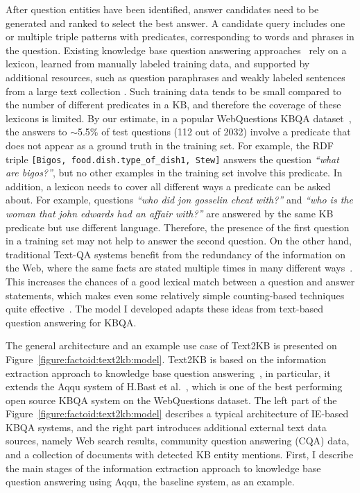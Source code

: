 After question entities have been identified, answer candidates need to be generated and ranked to select the best answer.
A candidate query includes one or multiple triple patterns with predicates, corresponding to words and phrases in the question.
Existing knowledge base question answering approaches~\cite{bastmore:cikm:2015:aquu,BerantCFL13:sempre,BerantL14:parasempre,berant2015imitation,BordesCW14:emnlp,yao2014freebase} rely on a lexicon, learned from manually labeled training data, and supported by additional resources, such as question paraphrases \cite{BerantL14:parasempre} and weakly labeled sentences from a large text collection \cite{YaoD14}.
Such training data tends to be small compared to the number of different predicates in a KB, and therefore the coverage of these lexicons is limited.
By our estimate, in a popular WebQuestions KBQA dataset~\cite{BerantCFL13:sempre}, the answers to $\sim$5.5\% of test questions (112 out of 2032) involve a predicate that does not appear as a ground truth in the training set.
For example, the RDF triple \texttt{[Bigos, food.dish.type\_of\_dish1, Stew]} answers the question \textit{``what are bigos?''}, but no other examples in the training set involve this predicate.
In addition, a lexicon needs to cover all different ways a predicate can be asked about.
For example, questions \textit{``who did jon gosselin cheat with?''} and \textit{``who is the woman that john edwards had an affair with?''} are answered by the same KB predicate but use different language.
Therefore, the presence of the first question in a training set may not help to answer the second question.
On the other hand, traditional Text-QA systems benefit from the redundancy of the information on the Web, where the same facts are stated multiple times in many different ways~\cite{lin2007exploration}.
This increases the chances of a good lexical match between a question and answer statements, which makes even some relatively simple counting-based techniques quite effective~\cite{brill2002analysis}.
The model I developed adapts these ideas from text-based question answering for KBQA.

The general architecture and an example use case of Text2KB is presented on Figure~\ref{figure:factoid:text2kb:model}.
Text2KB is based on the information extraction approach to knowledge base question answering~\cite{YaoD14}, in particular, it extends the Aqqu system of H.Bast et al.~\cite{bastmore:cikm:2015:aquu}, which is one of the best performing open source KBQA system on the WebQuestions dataset.
The left part of the Figure~\ref{figure:factoid:text2kb:model} describes a typical architecture of IE-based KBQA systems, and the right part introduces additional external text data sources, namely Web search results, community question answering (CQA) data, and a collection of documents with detected KB entity mentions.
First, I describe the main stages of the information extraction approach to knowledge base question answering using Aqqu, the baseline system, as an example.

